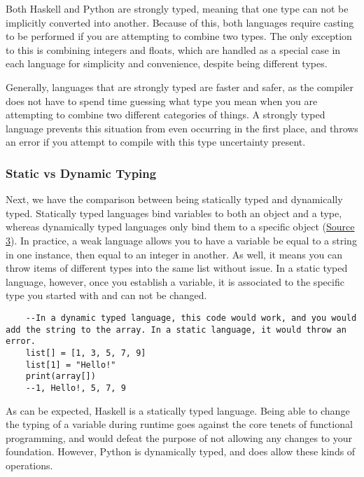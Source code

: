 \documentclass{article}
\begin{document}
    \medskip\noindent Both Haskell and Python are strongly typed, meaning that one type can not be implicitly converted into another. Because of this, both languages require casting to be performed if you are attempting to combine two types. The only exception to this is combining integers and floats, which are handled as a special case in each language for simplicity and convenience, despite being different types. 
    
    \medskip\noindent Generally, languages that are strongly typed are faster and safer, as the compiler does not have to spend time guessing what type you mean when you are attempting to combine two different categories of things. A strongly typed language prevents this situation from even occurring in the first place, and throws an error if you attempt to compile with this type uncertainty present. 
    
    \subsubsection{Static vs Dynamic Typing}
    \medskip\noindent Next, we have the comparison between being statically typed and dynamically typed. Statically typed languages bind variables to both an object and a type, whereas dynamically typed languages only bind them to a specific object (\href{https://pythonconquerstheuniverse.wordpress.com/2009/10/03/static-vs-dynamic-typing-of-programming-languages/} {Source 3}). In practice, a weak language allows you to have a variable be equal to a string in one instance, then equal to an integer in another. As well, it means you can throw items of different types into the same list without issue. In a static typed language, however, once you establish a variable, it is associated to the specific type you started with and can not be changed. 
    
       \begin{lstlisting}
    --In a dynamic typed language, this code would work, and you would add the string to the array. In a static language, it would throw an error. 
    list[] = [1, 3, 5, 7, 9]
    list[1] = "Hello!"
    print(array[])
    --1, Hello!, 5, 7, 9
    \end{lstlisting}
    
    \medskip\noindent As can be expected, Haskell is a statically typed language. Being able to change the typing of a variable during runtime goes against the core tenets of functional programming, and would defeat the purpose of not allowing any changes to your foundation. However, Python is dynamically typed, and does allow these kinds of operations. 
    
\end{document}
